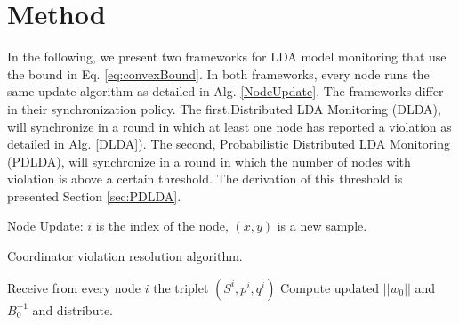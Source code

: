 \documentclass{sig-alternate-05-2015}
\begin{document}
\section{Method}
In the following, we present two frameworks for LDA model monitoring that use
the bound in Eq. \ref{eq:convexBound}. In both frameworks, every node runs the same
update algorithm as detailed in Alg. \ref{NodeUpdate}.
The frameworks differ in their synchronization policy. %
The first,Distributed LDA Monitoring (DLDA), will synchronize in a round
in which at least one node has reported a violation as detailed in Alg.
\ref{DLDA}).
The second, Probabilistic Distributed LDA Monitoring (PDLDA), will synchronize in
a round in which the number of nodes with violation is above a certain
threshold.
The derivation of this threshold is presented Section \ref{sec:PDLDA}.


\begin{algorithm}
\caption{Node Update: $i$ is the index of the node, $(x,y)$ is a new sample.}
\label{NodeUpdate}
\end{algorithm}

\begin{algorithm}
\caption{Coordinator violation resolution algorithm.}\label{DLDA}
\begin{algorithmic}[1]
\State Receive from every node $i$ the triplet $(S^i,p^i,q^i)$
\State Compute updated $||w_0||$ and $B_0^{-1}$ and distribute.
\EndIf
\EndProcedure
\end{algorithmic}
\end{algorithm}
\end{document}
